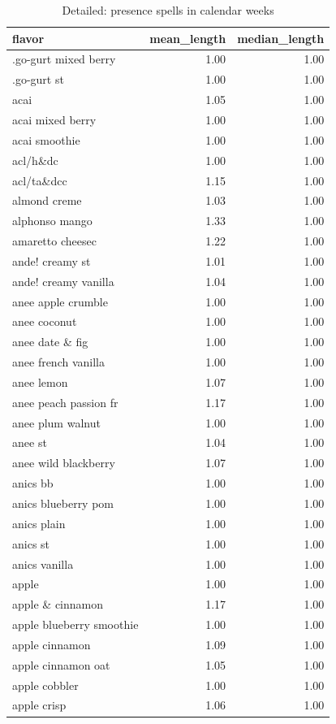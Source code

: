 \begin{table}
\caption{Detailed: presence spells in calendar weeks}
\begin{tabular}{lrr}
\toprule
flavor & mean\_length & median\_length \\
\midrule
.go-gurt mixed berry & 1.00 & 1.00 \\
.go-gurt st & 1.00 & 1.00 \\
acai & 1.05 & 1.00 \\
acai mixed berry & 1.00 & 1.00 \\
acai smoothie & 1.00 & 1.00 \\
acl/h\&dc & 1.00 & 1.00 \\
acl/ta\&dcc & 1.15 & 1.00 \\
almond creme & 1.03 & 1.00 \\
alphonso mango & 1.33 & 1.00 \\
amaretto cheesec & 1.22 & 1.00 \\
ande! creamy st & 1.01 & 1.00 \\
ande! creamy vanilla & 1.04 & 1.00 \\
anee apple crumble & 1.00 & 1.00 \\
anee coconut & 1.00 & 1.00 \\
anee date \& fig & 1.00 & 1.00 \\
anee french vanilla & 1.00 & 1.00 \\
anee lemon & 1.07 & 1.00 \\
anee peach passion fr & 1.17 & 1.00 \\
anee plum walnut & 1.00 & 1.00 \\
anee st & 1.04 & 1.00 \\
anee wild blackberry & 1.07 & 1.00 \\
anics bb & 1.00 & 1.00 \\
anics blueberry pom & 1.00 & 1.00 \\
anics plain & 1.00 & 1.00 \\
anics st & 1.00 & 1.00 \\
anics vanilla & 1.00 & 1.00 \\
apple & 1.00 & 1.00 \\
apple \& cinnamon & 1.17 & 1.00 \\
apple blueberry smoothie & 1.00 & 1.00 \\
apple cinnamon & 1.09 & 1.00 \\
apple cinnamon oat & 1.05 & 1.00 \\
apple cobbler & 1.00 & 1.00 \\
apple crisp & 1.06 & 1.00 \\

\end{tabular}
\end{table}
